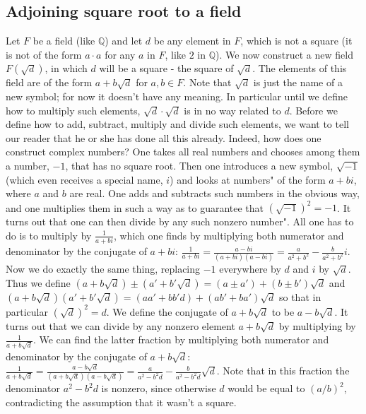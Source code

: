 \subsection{Adjoining square root to a field}
Let $F$ be a field (like $\mathbb{Q}$) and let $d$ be any element in $F$, which is not a square (it is not of the form $a\cdot a$ for any $a$ in $F$, like $2$ in $\mathbb{Q}$). We now construct a new field $F(\sqrt{d})$, in which $d$ will be a square - the square of $\sqrt{d}$. The elements of this field are of the form $a+b\sqrt{d}$ for $a,b\in F$. Note that $\sqrt{d}$ is just the name of a new symbol; for now it doesn't have any meaning. In particular until we define how to multiply such elements, $\sqrt{d}\cdot \sqrt{d}$ is in no way related to $d$.
Before we define how to add, subtract, multiply and divide such elements, we want to tell our reader that he or she has done all this already. Indeed, how does one construct complex numbers? One takes all real numbers and chooses among them a number, $-1$, that has no square root. Then one introduces a new symbol, $\sqrt{-1}$ (which even receives a special name, $i$) and looks at numbers" of the form $a+bi$, where $a$ and $b$ are real. One adds and subtracts such numbers in the obvious way, and one multiplies them in such a way as to guarantee that $(\sqrt{-1})^2=-1$. It turns out that one can then divide by any such nonzero number". All one has to do is to multiply by $\frac{1}{a+bi}$, which one finds by multiplying both numerator and denominator by the conjugate of $a+bi$: $\frac{1}{a+bi}=\frac{a-bi}{(a+bi)(a-bi)}=\frac{a}{a^2+b^2}-\frac{b}{a^2+b^2}i$.
Now we do exactly the same thing, replacing $-1$ everywhere by $d$ and $i$ by $\sqrt{d}$. Thus we define $(a+b\sqrt{d})\pm(a'+b'\sqrt{d})=(a\pm a')+ (b\pm b')\sqrt{d}$ and $(a+b\sqrt{d})(a'+b'\sqrt{d})=(aa'+bb'd)+(ab'+ba')\sqrt{d}$ so that in particular $(\sqrt{d})^2=d$. We define the conjugate of $a+b\sqrt{d}$ to be $a-b\sqrt{d}$. It turns out that we can divide by any nonzero element $a+b\sqrt{d}$ by multiplying by $\frac{1}{a+b\sqrt{d}}$. We can find the latter fraction by multiplying both numerator and denominator by the conjugate of $a+b\sqrt{d}$: $\frac{1}{a+b\sqrt{d}}=\frac{a-b\sqrt{d}}{(a+b\sqrt{d})(a-b\sqrt{d})}=\frac{a}{a^2-b^2 d}-\frac{b}{a^2- b^2 d}\sqrt{d}$. Note that in this fraction the denominator $a^2-b^2 d$ is nonzero, since otherwise $d$ would be equal to $(a/b)^2$, contradicting the assumption that it wasn't a square.

